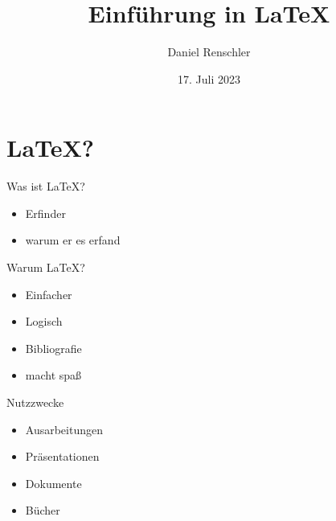 \documentclass{beamer}
\title{Einf\"uhrung in \LaTeX}
\author{Daniel Renschler}
\date{17. Juli 2023}
\begin{document}
\begin{frame}
    \titlepage 
\end{frame}




\begin{frame}
    \tableofcontents
\end{frame}



\section{\LaTeX?}
\begin{frame}{Was ist \LaTeX?}
    \begin{itemize}
        \item Erfinder
        \item warum er es erfand
    \end{itemize}

\end{frame}



\begin{frame}{Warum \LaTeX?}
    \begin{itemize}
        \item Einfacher
        \item Logisch
        \item Bibliografie
        \item macht spa\ss
    \end{itemize}

\end{frame}



\begin{frame}{Nutzzwecke}

    \begin{itemize}
        \item Ausarbeitungen
        \item Pr\"asentationen
        \item Dokumente
        \item B\"ucher
    \end{itemize}
\end{frame}
\end{document}
